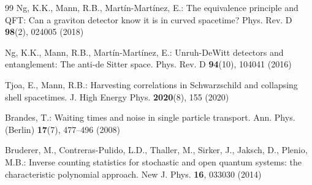 \begin{thebibliography}{99}
Ng, K.K., Mann, R.B., Mart\'in-Mart\'inez, E.: The equivalence principle and QFT: Can a graviton detector know it is in curved spacetime? Phys. Rev. D \textbf{98}(2), 024005 (2018)

Ng, K.K., Mann, R.B., Mart\'in-Mart\'inez, E.: Unruh-DeWitt detectors and entanglement: The anti-de Sitter space. Phys. Rev. D \textbf{94}(10), 104041 (2016)

Tjoa, E., Mann, R.B.: Harvesting correlations in Schwarzschild and collapsing shell spacetimes. J. High Energy Phys. \textbf{2020}(8), 155 (2020)

Brandes, T.: Waiting times and noise in single particle transport. Ann. Phys. (Berlin) \textbf{17}(7), 477--496 (2008)

Bruderer, M., Contreras-Pulido, L.D., Thaller, M., Sirker, J., Jaksch, D., Plenio, M.B.: Inverse counting statistics for stochastic and open quantum systems: the characteristic polynomial approach. New J. Phys. \textbf{16}, 033030 (2014)

\end{thebibliography}
